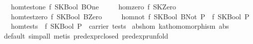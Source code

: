 \begin{isabellebody}
\ \ \ hom{}test{}one{}\ {}f\ {}SKBool\ BOne{}\ {}\ {}{}\isanewline
\ \ \ hom{}zero{}\ {}f\ SKZero\ {}\ {}{}\isanewline
\ \ \ hom{}test{}zero{}\ {}f\ {}SKBool\ BZero{}\ {}\ {}{}\isanewline
\ \ \ hom{}not{}\ {}f\ {}SKBool\ {}BNot\ P{}{}\ {}\ {}{}f\ {}SKBool\ P{}{}{}\isanewline
\ \ \ hom{}tests{}\ {}\ f\ {}SKBool\ P{}\ {}\ carrier\ tests{}\isanewline
\isanewline
{}\isamarkupfalse%
\ abs{}hom{}\ {}kat{}homomorphism\ abs{}\isanewline
%
\isadelimproof
\ \ %
\endisadelimproof
%
\isatagproof
{}\isamarkupfalse%
\ {}default{}\ simp{}all{}\ metis\ pred{}expr{}closed\ pred{}expr{}unfold{}%

\end{isabellebody}
